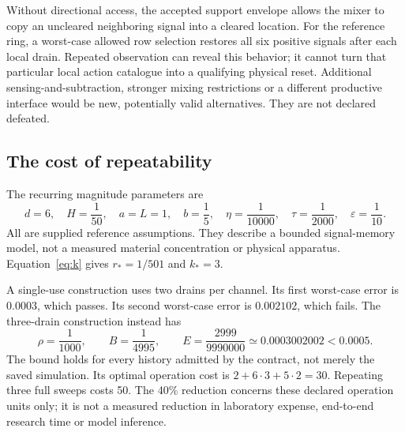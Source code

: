 \documentclass[11pt,letterpaper]{article}
\theoremstyle{definition}\newtheorem{definition}[theorem]{Definition}
\theoremstyle{remark}\newtheorem{remark}[theorem]{Remark}
\begin{document}
Without directional access, the accepted support envelope allows the mixer to copy an uncleared neighboring signal into a cleared location. For the reference ring, a worst-case allowed row selection restores all six positive signals after each local drain. Repeated observation can reveal this behavior; it cannot turn that particular local action catalogue into a qualifying physical reset. Additional sensing-and-subtraction, stronger mixing restrictions or a different productive interface would be new, potentially valid alternatives. They are not declared defeated.

\subsection{The cost of repeatability}
The recurring magnitude parameters are
\begin{equation}
 d=6,\quad H=\frac1{50},\quad a=L=1,\quad b=\frac15,
 \quad\eta=\frac1{10000},\quad\tau=\frac1{2000},
 \quad\varepsilon=\frac1{10}.
 \label{eq:settings}
\end{equation}
All are supplied reference assumptions. They describe a bounded signal-memory model, not a measured material concentration or physical apparatus. Equation~\eqref{eq:k} gives $r_*=1/501$ and $k_*=3$.

A single-use construction uses two drains per channel. Its first worst-case error is $0.0003$, which passes. Its second worst-case error is $0.002102$, which fails. The three-drain construction instead has
\begin{equation}
 \rho=\frac1{1000},\qquad
 B=\frac1{4995},\qquad
 E=\frac{2999}{9990000}\simeq0.0003002002 <0.0005.
 \label{eq:actualbound}
\end{equation}
The bound holds for every history admitted by the contract, not merely the saved simulation. Its optimal operation cost is $2+6\cdot3+5\cdot2=30$. Repeating three full sweeps costs 50. The 40\% reduction concerns these declared operation units only; it is not a measured reduction in laboratory expense, end-to-end research time or model inference.
\end{document}

